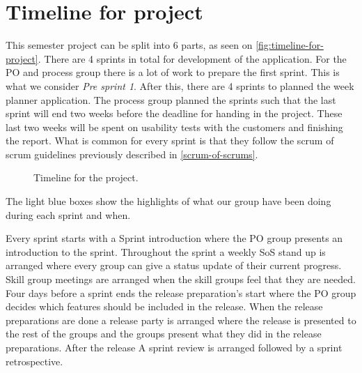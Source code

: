 \section{Timeline for project}
This semester project can be split into 6 parts, as seen on \autoref{fig:timeline-for-project}.
There are 4 sprints in total for development of the application. 
For the PO and process group there is a lot of work to prepare the first sprint.
This is what we consider \textit{Pre sprint 1}.
After this, there are 4 sprints to planned the week planner application.
The process group planned the sprints such that the last sprint will end two weeks before the deadline for handing in the project.
These last two weeks will be spent on usability tests with the customers and finishing the report.
What is common for every sprint is that they follow the scrum of scrum guidelines previously described in \autoref{scrum-of-scrums}.

\begin{figure}[H]
    \caption{\label{fig:timeline-for-project} Timeline for the project.}
\end{figure}

\noindent The light blue boxes show the highlights of what our group have been doing during each sprint and when.

\noindent Every sprint starts with a Sprint introduction where the PO group presents an introduction to the sprint.
Throughout the sprint a weekly SoS stand up is arranged where every group can give a status update of their current progress.
Skill group meetings are arranged when the skill groups feel that they are needed.\\
Four days before a sprint ends the release preparation's start where the PO group decides which features should be included in the release. When the release preparations are done a release party is arranged where the release is presented to the rest of the groups and the groups present what they did in the release preparations. 
After the release A sprint review is arranged followed by a sprint retrospective.

